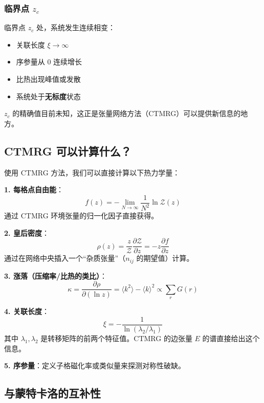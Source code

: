 \documentclass[12pt,a4paper]{ctexart}
\begin{document}
\subsubsection{临界点 $z_c$}

临界点 $z_c$ 处，系统发生连续相变：
\begin{itemize}
\item 关联长度 $\xi \to \infty$
\item 序参量从 0 连续增长
\item 比热出现峰值或发散
\item 系统处于\textbf{无标度}状态
\end{itemize}

$z_c$ 的精确值目前未知，这正是张量网络方法（CTMRG）可以提供新信息的地方。

\subsection{CTMRG 可以计算什么？}

使用 CTMRG 方法，我们可以直接计算以下热力学量：

\textbf{1. 每格点自由能}：
\begin{equation}
f(z) = -\lim_{N \to \infty} \frac{1}{N^2} \ln \mathcal{Z}(z)
\end{equation}
通过 CTMRG 环境张量的归一化因子直接获得。

\textbf{2. 皇后密度}：
\begin{equation}
\rho(z) = \frac{z}{\mathcal{Z}} \frac{\partial \mathcal{Z}}{\partial z} = -z \frac{\partial f}{\partial z}
\end{equation}
通过在网络中央插入一个``杂质张量''（$n_{ij}$ 的期望值）计算。

\textbf{3. 涨落（压缩率/比热的类比）}：
\begin{equation}
\kappa = \frac{\partial \rho}{\partial (\ln z)} = \langle k^2 \rangle - \langle k \rangle^2 \propto \sum_r G(r)
\end{equation}

\textbf{4. 关联长度}：
\begin{equation}
\xi = -\frac{1}{\ln(\lambda_2 / \lambda_1)}
\end{equation}
其中 $\lambda_1, \lambda_2$ 是转移矩阵的前两个特征值。CTMRG 的边张量 $E$ 的谱直接给出这个信息。

\textbf{5. 序参量}：定义子格磁化率或类似量来探测对称性破缺。

\subsection{与蒙特卡洛的互补性}
\end{document}
